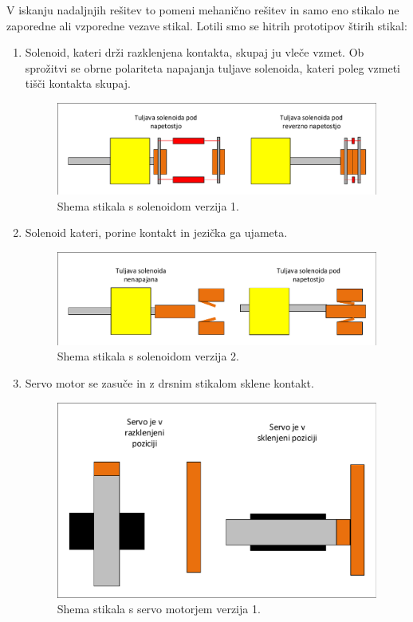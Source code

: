 \documentclass[a4paper,twoside,openright,12pt,Slovene]{book}
\begin{document}
    
    V iskanju nadaljnjih rešitev to pomeni mehanično rešitev in samo eno stikalo ne zaporedne ali vzporedne vezave stikal. Lotili smo se hitrih prototipov štirih stikal:
    \begin{enumerate}
   
        \item  Solenoid, kateri drži razklenjena kontakta, skupaj ju vleče vzmet. Ob sprožitvi se obrne polariteta napajanja tuljave solenoida, kateri poleg vzmeti tišči kontakta skupaj.
    \begin{figure}[H]
        \centering
        \includegraphics[width=1\columnwidth]{Sheme/StikaloSolenoidVerzija1.pdf}
        \caption{\label{/StikaloSolenoidVerzija1} Shema stikala s solenoidom verzija 1.}
    \end{figure}
    
    \item  Solenoid kateri, porine kontakt in jezička ga ujameta.
    \begin{figure}[H]
        \centering
        \includegraphics[width=1\columnwidth]{Sheme/StikaloSolenoidVerzija2.pdf}
        \caption{\label{/StikaloSolenoidVerzija2} Shema stikala s solenoidom verzija 2.}
    \end{figure}
    
    \item  Servo motor se zasuče in z drsnim stikalom sklene kontakt.
    \begin{figure}[H]
        \centering
        \includegraphics[width=1\columnwidth]{Sheme/StikaloServoVerzija1.pdf}
        \caption{\label{StikaloServoVerzija1} Shema stikala s servo motorjem verzija 1.}
    \end{figure}
    

\end{enumerate}
\end{document}
